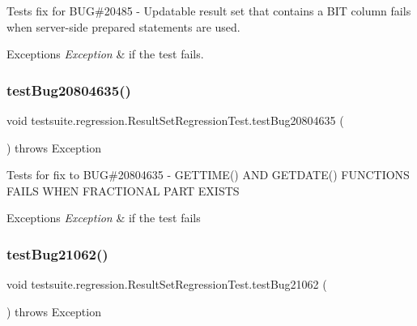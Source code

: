 Tests fix for B\+UG\#20485 -\/ Updatable result set that contains a B\+IT column fails when server-\/side prepared statements are used.


\begin{DoxyExceptions}{Exceptions}
{\em Exception} & if the test fails. \\
\hline
\end{DoxyExceptions}
\mbox{\label{classtestsuite_1_1regression_1_1_result_set_regression_test_a73eb842a830acedbf8af195858dfc58f}} 
\subsubsection{\texorpdfstring{test\+Bug20804635()}{testBug20804635()}}
{\footnotesize\ttfamily void testsuite.\+regression.\+Result\+Set\+Regression\+Test.\+test\+Bug20804635 (\begin{DoxyParamCaption}{ }\end{DoxyParamCaption}) throws Exception}

Tests for fix to B\+UG\#20804635 -\/ G\+E\+T\+T\+I\+M\+E() A\+ND G\+E\+T\+D\+A\+T\+E() F\+U\+N\+C\+T\+I\+O\+NS F\+A\+I\+LS W\+H\+EN F\+R\+A\+C\+T\+I\+O\+N\+AL P\+A\+RT E\+X\+I\+S\+TS


\begin{DoxyExceptions}{Exceptions}
{\em Exception} & if the test fails \\
\hline
\end{DoxyExceptions}
\mbox{\label{classtestsuite_1_1regression_1_1_result_set_regression_test_a18bcdff4c2c8f2245a2e5bb6696e2506}} 
\subsubsection{\texorpdfstring{test\+Bug21062()}{testBug21062()}}
{\footnotesize\ttfamily void testsuite.\+regression.\+Result\+Set\+Regression\+Test.\+test\+Bug21062 (\begin{DoxyParamCaption}{ }\end{DoxyParamCaption}) throws Exception}

